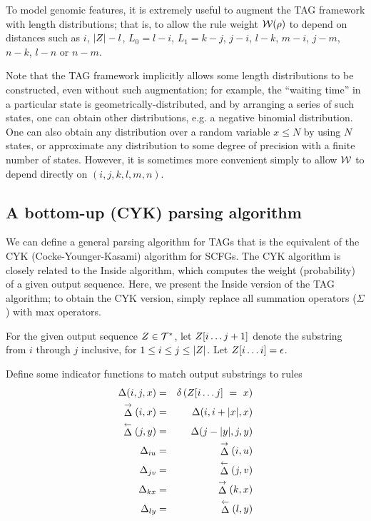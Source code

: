 \documentclass[10pt]{article}
\begin{document}
\newcommand\outerlen{L_0}
\newcommand\innerlen{L_1}

To model genomic features, it is extremely useful to augment the TAG framework with length distributions;
that is, to allow the rule weight ${\cal W}(\rho)$ to depend on distances
such as $i$, $|Z|-l$, $\outerlen = l-i$, $\innerlen = k-j$, $j-i$, $l-k$, $m-i$, $j-m$, $n-k$, $l-n$ or $n-m$.

Note that the TAG framework implicitly allows some length distributions to be constructed, even without such augmentation;
for example, the ``waiting time'' in a particular state is geometrically-distributed, and by arranging a series of such states,
one can obtain other distributions, e.g. a negative binomial distribution.
One can also obtain any distribution over a random variable $x \leq N$ by using $N$ states,
or approximate any distribution to some degree of precision with a finite number of states.
However, it is sometimes more convenient simply to allow ${\cal W}$ to depend directly on $(i,j,k,l,m,n)$.

\subsection{A bottom-up (CYK) parsing algorithm}

We can define a general parsing algorithm for TAGs
that is the equivalent of the CYK (Cocke-Younger-Kasami) algorithm for SCFGs.
The CYK algorithm is closely related to the Inside algorithm,
which computes the weight (probability) of a given output sequence.
Here, we present the Inside version of the TAG algorithm;
to obtain the CYK version, simply replace all summation operators ($\Sigma$)
with max operators.

For the given output sequence $Z \in {\cal T}^\ast$, let $Z[i \ldots j+1]$ denote the substring from $i$ through $j$ inclusive, for $1 \leq i \leq j \leq |Z|$.
Let $Z[i \ldots i] = \epsilon$.

\newcommand\match{\Delta}
\newcommand\fmatch{\stackrel{\rightarrow}{\match}}
\newcommand\rmatch{\stackrel{\leftarrow}{\match}}
\newcommand\iumatch{\match_{iu}}
\newcommand\jvmatch{\match_{jv}}
\newcommand\kxmatch{\match_{kx}}
\newcommand\lymatch{\match_{ly}}

Define some indicator functions to match output substrings to rules
\begin{eqnarray*}
\match(i,j,x) & = & \delta \left( \outsubseq{i}{j}\ =\ x \right) \\
\fmatch(i,x) & = & \match(i,i+|x|,x) \\
\rmatch(j,y) & = & \match(j-|y|,j,y) \\
\iumatch & = & \fmatch(i,u) \\
\jvmatch & = & \rmatch(j,v) \\
\kxmatch & = & \fmatch(k,x) \\
\lymatch & = & \rmatch(l,y)
\end{eqnarray*}
\end{document}

